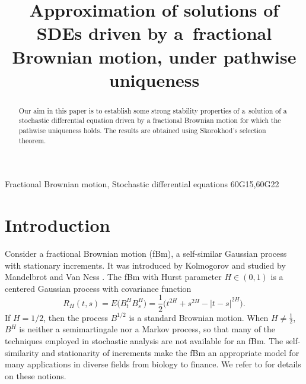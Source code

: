 \documentclass[numbers,compress,v1.0.1]{vmsta}
\theoremstyle{definition}
\begin{document}
%
\begin{frontmatter}

\title{Approximation of solutions of SDEs driven by a~fractional Brownian motion, under pathwise uniqueness}

\author[a]{}
\author[a,b]{}

\address[a]{Cadi Ayyad University, Faculty of Sciences Semlalia,\\
Av. My Abdellah, 2390, Marrakesh, Morocco}
\address[b]{Hassan II Academy of Sciences and Technology Rabat, Morocco}


\begin{abstract}
Our aim in this paper is to establish some strong stability properties
of a~solution of a stochastic differential equation driven by a
fractional Brownian motion for which the pathwise uniqueness holds. The
results are obtained using Skorokhod's selection theorem.
\end{abstract}

\begin{keyword}
Fractional Brownian motion\sep
Stochastic differential equations
\MSC[2010] 60G15\sep60G22
\end{keyword}

%
\end{frontmatter}

\section{Introduction}

Consider a fractional Brownian motion (fBm), a self-similar Gaussian
process with stationary increments. It was introduced by Kolmogorov
\cite{kol} and studied by Mandelbrot and Van Ness \cite{MN}. The fBm
with Hurst parameter $H\in(0,1)$ is a centered Gaussian process with
covariance function
%
\[
R_H(t,s)=E\bigl(B_{t}^{H}B_{s}^{H}
\bigr)=\frac{1}{2} \bigl(t^{2H}+s^{2H}-|t-s|^{2H}
\bigr).
\]
%
If $H=1/2$, then the process $B^{1/2}$ is a standard Brownian motion.
When \hbox{$H\neq\frac{1}{2}$}, $B^H$ is neither a semimartingale nor
a Markov process, so that many of the techniques employed in stochastic
analysis are not available for an fBm. The self-similarity and
stationarity of increments make the fBm an appropriate model for many
applications in diverse fields from biology to finance. We refer to
\cite{Nua10} for details on these notions.
\end{document}
